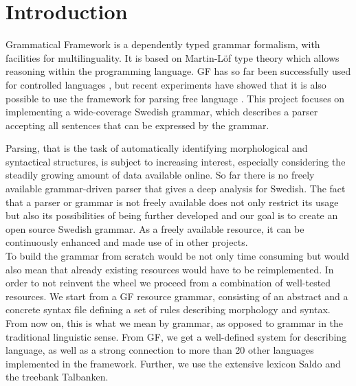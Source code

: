 \documentclass{report}
\begin{document}
\newpage
\tableofcontents
%
\newpage
\setcounter{page}{1} %
\chapter{Introduction}
\thispagestyle{plain}
Grammatical Framework \cite{gfbok} is a dependently typed grammar formalism,
with facilities for multilinguality. It is based on Martin-Löf type theory which allows
reasoning within the programming language.
GF has so far been successfully used for 
controlled languages \cite{cnl}, but recent experiments have showed
that it is also possible to use the framework for parsing free language \cite{patent}.
This project focuses on implementing a wide-coverage Swedish grammar, which
describes a parser accepting all sentences that can be expressed by the grammar.

Parsing, that is the task of automatically identifying morphological and
syntactical structures, is subject to increasing interest, especially
considering the steadily growing amount of data available online. 
So far there is no freely available grammar-driven parser that gives a deep
analysis for Swedish. The fact that %
a parser or grammar is not freely available does not only restrict its
usage but also its possibilities of being further developed and our
goal is
to create an open source Swedish grammar. %
As a freely available resource, it can be continuously enhanced and
made use of in other projects.\\
To build the grammar from scratch would be not only time consuming but
would also mean that already existing resources would have to be reimplemented.
In order to not reinvent the wheel we proceed from a combination of well-tested
resources.
We start from a GF resource grammar, consisting of an abstract and a concrete syntax
file defining a set of rules describing morphology and syntax.
From now on, this is what we mean by grammar, as
opposed to grammar in the traditional linguistic sense. 
From GF, we get %
a well-defined system for describing language, as well as a strong connection to
more than 20 other languages implemented in the framework. Further, we use
the extensive lexicon Saldo and the treebank Talbanken.
\end{document}
